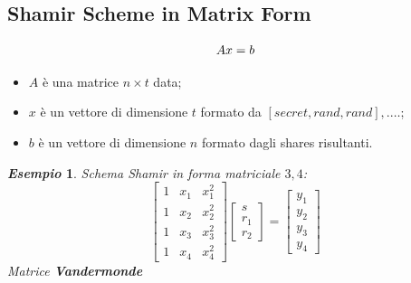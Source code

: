 \documentclass{book}
\newtheorem{esempio}{\emph{Esempio}}
\begin{document}
\subsection{Shamir Scheme in Matrix Form}
\begin{equation*}
	\centering
	Ax=b
\end{equation*}
\begin{itemize}
	\item \(A\) è una matrice \(n\times t\) data;
	\item \(x\) è un vettore di dimensione \(t\) formato da \([secret,rand,rand],.\ldots \);
	\item \(b\) è un vettore di dimensione \(n\) formato dagli shares risultanti.
\end{itemize}
\begin{esempio}
	Schema Shamir in forma matriciale \(3,4\):\begin{equation*}
		\begin{bmatrix}
			1 & x_{1} & x_{1}^2 \\
			1 & x_{2} & x_{2}^2 \\
			1 & x_{3} & x_{3}^2 \\
			1 & x_{4} & x_{4}^2
		\end{bmatrix}
		\begin{bmatrix}
			s \\r_{1}\\r_{2}
		\end{bmatrix}=\begin{bmatrix}
			y_{1} \\y_{2}\\y_{3}\\y_{4}
		\end{bmatrix}
	\end{equation*}
	Matrice \textbf{Vandermonde}
\end{esempio}
\end{document}
